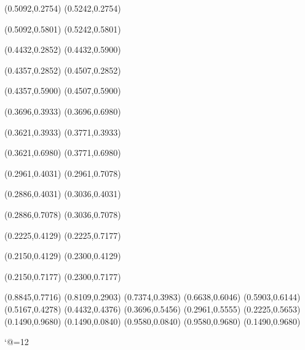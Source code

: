 \PST@Solid(0.5092,0.2754)
(0.5242,0.2754)

\PST@Solid(0.5092,0.5801)
(0.5242,0.5801)

\PST@Solid(0.4432,0.2852)
(0.4432,0.5900)

\PST@Solid(0.4357,0.2852)
(0.4507,0.2852)

\PST@Solid(0.4357,0.5900)
(0.4507,0.5900)

\PST@Solid(0.3696,0.3933)
(0.3696,0.6980)

\PST@Solid(0.3621,0.3933)
(0.3771,0.3933)

\PST@Solid(0.3621,0.6980)
(0.3771,0.6980)

\PST@Solid(0.2961,0.4031)
(0.2961,0.7078)

\PST@Solid(0.2886,0.4031)
(0.3036,0.4031)

\PST@Solid(0.2886,0.7078)
(0.3036,0.7078)

\PST@Solid(0.2225,0.4129)
(0.2225,0.7177)

\PST@Solid(0.2150,0.4129)
(0.2300,0.4129)

\PST@Solid(0.2150,0.7177)
(0.2300,0.7177)

\PST@Diamond(0.8845,0.7716)
\PST@Diamond(0.8109,0.2903)
\PST@Diamond(0.7374,0.3983)
\PST@Diamond(0.6638,0.6046)
\PST@Diamond(0.5903,0.6144)
\PST@Diamond(0.5167,0.4278)
\PST@Diamond(0.4432,0.4376)
\PST@Diamond(0.3696,0.5456)
\PST@Diamond(0.2961,0.5555)
\PST@Diamond(0.2225,0.5653)
\PST@Border(0.1490,0.9680)
(0.1490,0.0840)
(0.9580,0.0840)
(0.9580,0.9680)
(0.1490,0.9680)

\catcode`@=12
\fi
\endpspicture
